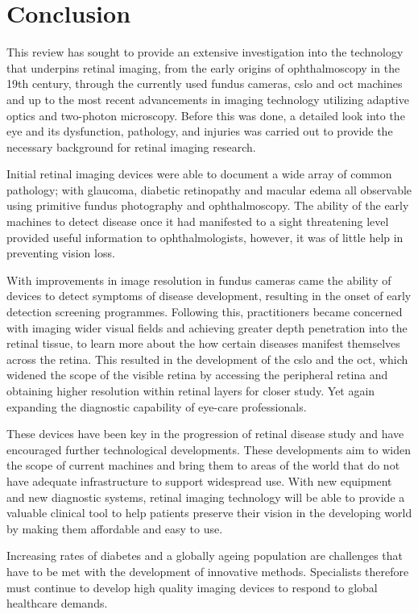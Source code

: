 \chapter{Conclusion}

\label{conclusion}

This review has sought to provide an extensive investigation
into the technology that underpins retinal imaging, from the
early origins of ophthalmoscopy in the 19th century, through the 
currently used fundus cameras, \gls{cslo} and \Gls{oct} machines and up 
to the most recent advancements in imaging technology utilizing 
adaptive optics and two-photon microscopy. Before this was done, 
a detailed look into the eye and its dysfunction, pathology, and 
injuries was carried out to provide the necessary background for 
retinal imaging research.

Initial retinal imaging devices were able to document a wide array 
of common pathology; with glaucoma, diabetic retinopathy and macular 
edema all observable using primitive fundus photography and 
ophthalmoscopy. The ability of the early machines to detect 
disease once it had manifested to a sight threatening level provided 
useful information to ophthalmologists, however, it was of little help 
in preventing vision loss. 

With improvements in image resolution in fundus cameras came 
the ability of devices to detect symptoms of disease development, 
resulting in the onset of early detection screening programmes. 
Following this, practitioners became concerned with imaging 
wider visual fields and achieving greater depth penetration into 
the retinal tissue, to learn more about the how certain diseases 
manifest themselves across the retina. This resulted in the 
development of the \gls{cslo} and the \Gls{oct}, which widened the scope 
of the visible retina by accessing the peripheral retina and obtaining 
higher resolution within retinal layers for closer study. Yet again 
expanding the diagnostic capability of eye-care professionals. 

These devices have been key in the progression of retinal disease 
study and have encouraged further technological developments. 
These developments aim to widen the scope of current machines 
and bring them to areas of the world that do not have adequate 
infrastructure to support widespread use. With new equipment and 
new diagnostic systems, retinal imaging technology will be able to 
provide a valuable clinical tool to help patients preserve their vision 
in the developing world by making them affordable and easy to use.
 
Increasing rates of diabetes and a globally ageing population are 
challenges that have to be met with the development of innovative 
methods. Specialists therefore must continue to develop high 
quality imaging devices to respond to global healthcare demands. 

